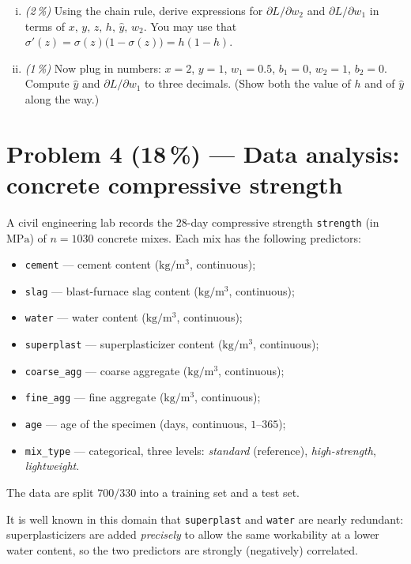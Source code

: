 \documentclass[11pt,a4paper]{article}
\newcommand{\points}[1]{\textbf{(#1\,\%)}}
\newcommand{\subpoints}[1]{\textit{(#1\,\%)}}
\begin{document}
\begin{enumerate}[(i)]
  \item \subpoints{2} Using the chain rule, derive expressions for $\partial L/\partial w_2$ and $\partial L/\partial w_1$ in terms of $x,\,y,\,z,\,h,\,\hat y,\, w_2$. You may use that $\sigma'(z)=\sigma(z)\bigl(1-\sigma(z)\bigr)=h(1-h)$.
  \item \subpoints{1} Now plug in numbers: $x=2$, $y=1$, $w_1=0.5$, $b_1=0$, $w_2=1$, $b_2=0$. Compute $\hat y$ and $\partial L/\partial w_1$ to three decimals. (Show both the value of $h$ and of $\hat y$ along the way.)
\end{enumerate}

\vfill\eject

\section*{Problem 4 \points{18} --- Data analysis: concrete compressive strength
}

A civil engineering lab records the $28$-day compressive strength \texttt{strength} (in $\mathrm{MPa}$) of $n=1030$ concrete mixes. Each mix has the following predictors:
\begin{itemize}
  \item \texttt{cement} --- cement content ($\mathrm{kg/m^3}$, continuous);
  \item \texttt{slag} --- blast-furnace slag content ($\mathrm{kg/m^3}$, continuous);
  \item \texttt{water} --- water content ($\mathrm{kg/m^3}$, continuous);
  \item \texttt{superplast} --- superplasticizer content ($\mathrm{kg/m^3}$, continuous);
  \item \texttt{coarse\_agg} --- coarse aggregate ($\mathrm{kg/m^3}$, continuous);
  \item \texttt{fine\_agg} --- fine aggregate ($\mathrm{kg/m^3}$, continuous);
  \item \texttt{age} --- age of the specimen (days, continuous, $1$--$365$);
  \item \texttt{mix\_type} --- categorical, three levels: \emph{standard} (reference), \emph{high-strength}, \emph{lightweight}.
\end{itemize}

The data are split $700/330$ into a training set and a test set.

It is well known in this domain that \texttt{superplast} and \texttt{water} are nearly redundant: superplasticizers are added \emph{precisely} to allow the same workability at a lower water content, so the two predictors are strongly (negatively) correlated.
\end{document}
